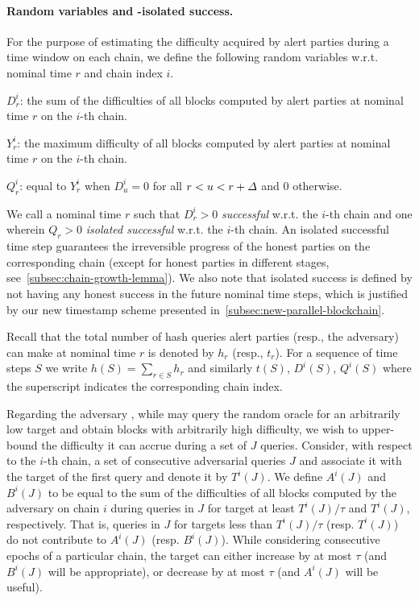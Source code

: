 \paragraph{Random variables and \delay-isolated success.}
%
For the purpose of estimating the difficulty acquired by alert parties during a time window on each chain, we define the following random variables w.r.t. nominal time $r$ and chain index $i$.
%
\begin{cccItemize}[noitemsep]
    \item $D^i_r$: the sum of the difficulties of all blocks computed by alert parties at nominal time $r$ on the $i$-th chain.

    \item $Y^i_r$: the maximum difficulty of all blocks computed by alert parties at nominal time $r$ on the $i$-th chain.

    \item $Q^i_r$: equal to $Y^i_r$ when $D^i_u = 0$ for all $r < u < r + \varDelta$ and 0 otherwise.
\end{cccItemize}
%
We call a nominal time $r$ such that $D^i_r > 0$ \emph{successful} w.r.t. the $i$-th chain and one wherein $Q_r > 0$ \emph{isolated successful} w.r.t. the $i$-th chain.
%
An isolated successful time step guarantees the irreversible progress of the honest parties on the corresponding chain (except for honest parties in different stages, see~\cref{subsec:chain-growth-lemma}).
%
We also note that isolated success is defined by not having any honest success in the future \delay nominal time steps, which is justified by our new timestamp scheme presented in~\cref{subsec:new-parallel-blockchain}.

Recall that the total number of hash queries alert parties (resp., the adversary) can make at nominal time $r$ is denoted by $h_r$ (resp., $t_r$).
%
For a sequence of time steps $S$ we write $h(S) = \sum_{r \in S} h_r$ and similarly $t(S)$, $D^i(S)$, $Q^i(S)$ where the superscript indicates the corresponding chain index.

Regarding the adversary \adv, while \adv may query the random oracle for an arbitrarily low target and obtain blocks with arbitrarily high difficulty, we wish to upper-bound the difficulty it can accrue during a set of $J$ queries.
%
Consider, with respect to the $i$-th chain, a set of consecutive adversarial queries $J$ and associate it with the target of the first query and denote it by $T^i(J)$.
%
We define $A^i(J)$ and $B^i(J)$ to be equal to the sum of the difficulties of all blocks computed by the adversary on chain $i$ during queries in $J$ for target at least $T^i(J) / \tau$ and $T^i(J)$, respectively.
%
That is, queries in $J$ for targets less than $T^i(J) / \tau$ (resp. $T^i (J)$) do not contribute to $A^i (J)$ (resp. $B^i (J)$).
%
While considering consecutive epochs of a particular chain, the target can either increase by at most $\tau$ (and $B^i (J)$ will be appropriate), or decrease by at most $\tau$ (and $A^i (J)$ will be useful).

